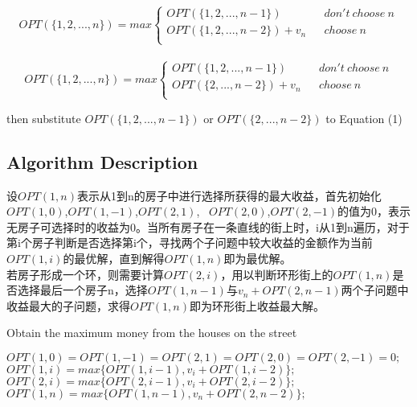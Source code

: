 \documentclass{article}
\begin{document}
\begin{equation} 
OPT(\{1,2,...,n\})=max\left\{
\begin{array}{lcr}
OPT(\{1,2,...,n-1\})       &      & don't\ choose\ n\\
OPT(\{1,2,...,n-2\})+ v_n     &      & choose\ n\\

\end{array} \right.
\end{equation} 
\\

\begin{equation} 
OPT(\{1,2,...,n\})=max\left\{
\begin{array}{lcr}
OPT(\{1,2,...,n-1\})       &      & don't\ choose\ n\\
OPT(\{2,...,n-2\})+ v_n     &      & choose\ n\\

\end{array} \right.
\end{equation}
 
\begin{center}
then substitute $OPT(\{1,2,...,n-1\})$ or $OPT(\{2,...,n-2\})$ to Equation (1)
\end{center}

\subsection{Algorithm Description}

设$OPT(1,n)$表示从1到n的房子中进行选择所获得的最大收益，首先初始化$OPT(1,0)$,$OPT(1,-1)$,$OPT(2,1)$,         \ $OPT(2,0)$,$OPT(2,-1)$的值为0，表示无房子可选择时的收益为0。当所有房子在一条直线的街上时，i从1到n遍历，对于第i个房子判断是否选择第i个，寻找两个子问题中较大收益的金额作为当前$OPT(1,i)$的最优解，直到解得$OPT(1,n)$即为最优解。
\\

若房子形成一个环，则需要计算$OPT(2,i)$，用以判断环形街上的$OPT(1,n)$是否选择最后一个房子n，选择$OPT(1,n-1)$与$v_n + OPT(2,n-1)$两个子问题中收益最大的子问题，求得$OPT(1,n)$即为环形街上收益最大解。

\begin{algorithm}[htbp]  
  \caption{Obtain the maximum money from the houses on the street}  
  \begin{algorithmic}[1] 
	\State $OPT(1,0) = OPT(1,-1) = OPT(2,1) = OPT(2,0) = OPT(2,-1) = 0;$
	\State $OPT(1,i) = max\{OPT(1,i-1), v_i + OPT(1,i-2)\};$
	\EndFor
	\State $OPT(2,i) = max\{OPT(2,i-1), v_i + OPT(2,i-2)\};$
	\EndFor
	\State $OPT(1,n) = max\{OPT(1,n-1), v_n + OPT(2,n-2)\};$
	\EndIf
    \EndFunction 
  \end{algorithmic}  
\end{algorithm} 
\end{document}

